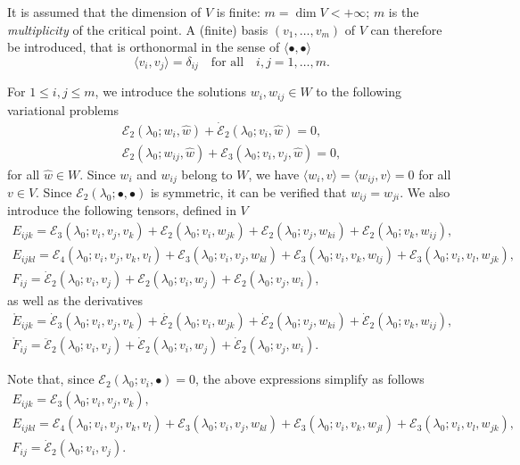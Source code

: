 \documentclass[12pt, final]{scrartcl}
\theoremstyle{definition}
\newcommand{\E}{\mathcal E}
\begin{document}
It is assumed that the dimension of $V$ is finite: $m = \dim V < +\infty$; $m$ is the \emph{multiplicity} of the
critical point. A (finite) basis $(v_1, \ldots, v_m)$ of $V$ can therefore be introduced, that is orthonormal in the
sense of $\langle \bullet, \bullet \rangle$
\begin{equation}
  \langle v_i, v_j \rangle = \delta_{ij} \quad \text{for all} \quad i, j = 1, \ldots, m.
\end{equation}

For $1 \leq i, j \leq m$, we introduce the solutions $w_i, w_{ij} \in W$ to the following variational problems
\begin{gather}
  \label{eq:20220524134525}
  \E_2(\lambda_0; w_i, \hat{w}) + \dot{\E}_2(\lambda_0; v_i, \hat{w}) = 0,\\
  \label{eq:20220519164523}
  \E_2(\lambda_0; w_{i j}, \hat{w})+\E_3(\lambda_0; v_i, v_j, \hat{w}) = 0,
\end{gather}
for all $\hat{w} \in W$. Since $w_{i}$ and $w_{ij}$ belong to $W$, we have
$\langle w_{i}, v \rangle = \langle w_{ij}, v \rangle = 0$ for all $v \in V$. Since $\E_2(\lambda_0; \bullet, \bullet)$
is symmetric, it can be verified that $w_{ij}=w_{ji}$. We also introduce the following tensors, defined in $V$
\begin{gather}
  E_{ijk} = \E_3(\lambda_0; v_i, v_j, v_k) + \E_2(\lambda_0; v_i, w_{jk}) + \E_2(\lambda_0; v_j, w_{ki}) + \E_2(\lambda_0; v_k, w_{ij}),\\
  \label{eq:20221116155507}
  E_{ijkl} = \E_4(\lambda_0 ; v_i, v_j, v_k, v_l) + \E_3(\lambda_0 ; v_i, v_j, w_{kl}) + \E_3(\lambda_0 ; v_i, v_k, w_{lj}) + \E_3(\lambda_0 ; v_i, v_l, w_{jk}),\\
  F_{ij} = \dot{\E}_2(\lambda_0; v_i, v_j) + \E_2(\lambda_0; v_i, w_j) + \E_2(\lambda_0; v_j, w_i),
\end{gather}
as well as the derivatives
\begin{gather}
  \label{eq:20220615063626}
  \mathring{E}_{ijk} = \dot{\E}_3(\lambda_0; v_i, v_j, v_k) + \dot{\E_2}(\lambda_0; v_i, w_{jk}) + \dot{\E}_2(\lambda_0; v_j, w_{ki}) + \dot{\E}_2(\lambda_0; v_k, w_{ij}),\\
  \label{eq:20220615063633}
  \mathring{F}_{ij} = \ddot{\E}_2(\lambda_0; v_i, v_j) + \dot{\E}_2(\lambda_0; v_i, w_j) + \dot{\E}_2(\lambda_0; v_j, w_i).
\end{gather}

Note that, since $\E_2(\lambda_0; v_i, \bullet) = 0$, the above expressions simplify as follows
\begin{gather}
  \label{eq:20220524135619}
  E_{ijk} = \E_3(\lambda_0; v_i, v_j, v_k),\\
  \label{eq:20220524135553}
  E_{ijkl} = \E_4(\lambda_0 ; v_i, v_j, v_k, v_l) + \E_3(\lambda_0 ; v_i, v_j, w_{kl}) + \E_3(\lambda_0 ; v_i, v_k, w_{jl}) + \E_3(\lambda_0 ; v_i, v_l, w_{jk}),\\
  \label{eq:20220524135643}
  F_{ij} = \dot{\E}_2(\lambda_0; v_i, v_j).
\end{gather}
\end{document}
